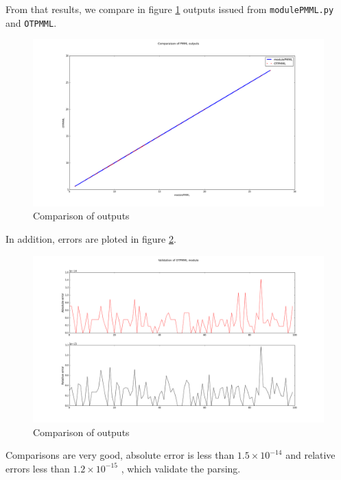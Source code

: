 From that results, we compare in figure \ref{fig:val:outputs} outputs issued from \texttt{modulePMML.py} and \texttt{OTPMML}.\\
\begin{figure}[!h]
 \begin{center}
  \includegraphics[scale=0.22]{comparaison_outputs.png}
 \end{center}
 \caption{Comparison of outputs}
 \label{fig:val:outputs}
\end{figure}
\newpage
In addition, errors are ploted in figure \ref{fig:val:errors}.
\begin{figure}[h]
 \begin{center}
  \includegraphics[scale=0.22]{absolute_relative_errors.png}
 \end{center}
 \caption{Comparison of outputs}
 \label{fig:val:errors}
\end{figure}
Comparisons are very good, absolute error is less than $1.5 \times 10^{-14}$ and relative errors less than $1.2 \times 10^{-15}$ , which validate the parsing.
